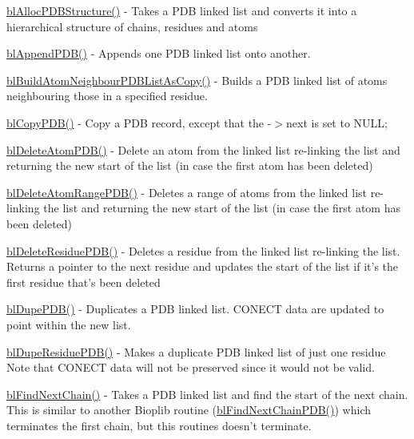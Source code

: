 \begin{DoxyItemize}
\item \hyperlink{pdb_8h_a39096516fa57de5431f60ff082ebcc55}{bl\-Alloc\-P\-D\-B\-Structure()} -\/ Takes a P\-D\-B linked list and converts it into a hierarchical structure of chains, residues and atoms
\item \hyperlink{_append_p_d_b_8c_aa860ec58117bba9e94990820e0b54c09}{bl\-Append\-P\-D\-B()} -\/ Appends one P\-D\-B linked list onto another.
\item \hyperlink{_build_atom_neighbour_p_d_b_list_8c_aba006f200a7ed9bf0c67a54f404a5c0e}{bl\-Build\-Atom\-Neighbour\-P\-D\-B\-List\-As\-Copy()} -\/ Builds a P\-D\-B linked list of atoms neighbouring those in a specified residue.
\item \hyperlink{_copy_p_d_b_8c_a80b3db4e74f9217af845d60f9b0b0204}{bl\-Copy\-P\-D\-B()} -\/ Copy a P\-D\-B record, except that the -\/$>$next is set to N\-U\-L\-L;
\item \hyperlink{_kill_p_d_b_8c_afa0e25249e5978f1ae19b5d8bebb6835}{bl\-Delete\-Atom\-P\-D\-B()} -\/ Delete an atom from the linked list re-\/linking the list and returning the new start of the list (in case the first atom has been deleted)
\item \hyperlink{_kill_p_d_b_8c_af87967ff3e2de0c55ab347087321dcb1}{bl\-Delete\-Atom\-Range\-P\-D\-B()} -\/ Deletes a range of atoms from the linked list re-\/linking the list and returning the new start of the list (in case the first atom has been deleted)
\item \hyperlink{_kill_p_d_b_8c_aaf1072ac9f0a3c591c0673d6499f4e51}{bl\-Delete\-Residue\-P\-D\-B()} -\/ Deletes a residue from the linked list re-\/linking the list. Returns a pointer to the next residue and updates the start of the list if it's the first residue that's been deleted
\item \hyperlink{_dupe_p_d_b_8c_ae2e1ff23efe21d11065a0950e525f2f3}{bl\-Dupe\-P\-D\-B()} -\/ Duplicates a P\-D\-B linked list. C\-O\-N\-E\-C\-T data are updated to point within the new list.
\item \hyperlink{_dupe_residue_p_d_b_8c_a962182369bc2bc6e2618bae8d913a610}{bl\-Dupe\-Residue\-P\-D\-B()} -\/ Makes a duplicate P\-D\-B linked list of just one residue Note that C\-O\-N\-E\-C\-T data will not be preserved since it would not be valid.
\item \hyperlink{pdb_8h_a5601ab36cb8d8fe8c012821a6e178e02}{bl\-Find\-Next\-Chain()} -\/ Takes a P\-D\-B linked list and find the start of the next chain. This is similar to another Bioplib routine (\hyperlink{_find_next_chain_p_d_b_8c_aee19617cd3ae67b737737a3aaf850484}{bl\-Find\-Next\-Chain\-P\-D\-B()}) which terminates the first chain, but this routines doesn't terminate.

\end{DoxyItemize}
